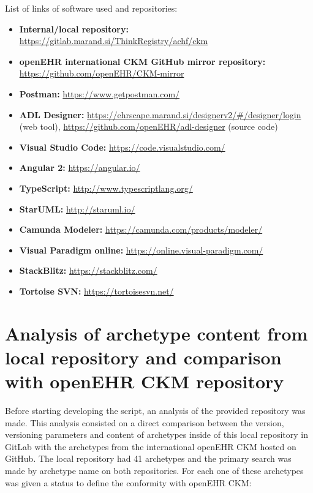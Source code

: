 \documentclass[mim_thesis.tex]{subfiles}
\begin{document}
List of links of software used and repositories: 
\begin{itemize}[noitemsep]
\item \textbf{Internal/local repository:} \url{https://gitlab.marand.si/ThinkRegistry/achf/ckm}
\item \textbf{openEHR international CKM GitHub mirror repository:} \url{https://github.com/openEHR/CKM-mirror}
\item \textbf{Postman:} \url{https://www.getpostman.com/}
\item \textbf{ADL Designer:} \url{https://ehrscape.marand.si/designerv2/#/designer/login} (web tool), \url{https://github.com/openEHR/adl-designer} (source code)
\item \textbf{Visual Studio Code:} \url{https://code.visualstudio.com/}
\item \textbf{Angular 2:} \url{https://angular.io/}
\item \textbf{TypeScript:} \url{http://www.typescriptlang.org/}
\item \textbf{StarUML:} \url{http://staruml.io/}
\item \textbf{Camunda Modeler:} \url{https://camunda.com/products/modeler/}
\item \textbf{Visual Paradigm online:} \url{https://online.visual-paradigm.com/}
\item \textbf{StackBlitz:} \url{https://stackblitz.com/}
\item \textbf{Tortoise SVN:} \url{https://tortoisesvn.net/}
\end{itemize}


\section{Analysis of archetype content from local repository and comparison with openEHR CKM repository}
Before starting developing the script, an analysis of the provided repository was made. This analysis consisted on a direct comparison between the version, versioning parameters and content of archetypes inside of this local repository in GitLab with the archetypes from the international openEHR CKM hosted on GitHub. The local repository had 41 archetypes and the primary search was made by archetype name on both repositories. For each one of these archetypes was given a status to define the conformity with openEHR CKM: 
\end{document}

